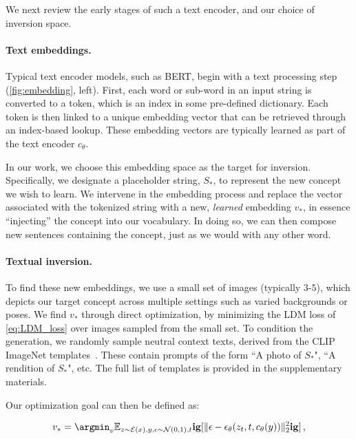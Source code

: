 We next review the early stages of such a text encoder, and our choice of inversion space.

\paragraph{Text embeddings.}

Typical text encoder models, such as BERT, begin with a text processing step (\ref{fig:embedding}, left). First, each word or sub-word in an input string is converted to a token, which is an index in some pre-defined dictionary. Each token is then linked to a unique embedding vector that can be retrieved through an index-based lookup. These embedding vectors are typically learned as part of the text encoder $c_\theta$.

In our work, we choose this embedding space as the target for inversion. Specifically, we designate a placeholder string, $S_*$, to represent the new concept we wish to learn. We intervene in the embedding process and replace the vector associated with the tokenized string with a new,  \textit{learned} embedding $v_*$, in essence ``injecting'' the concept into our vocabulary. In doing so, we can then compose new sentences containing the concept, just as we would with any other word. 

\paragraph{Textual inversion.} To find these new embeddings, we use a small set of images (typically $3$-$5$), which depicts our target concept across multiple settings such as varied backgrounds or poses. We find $v_*$ through direct optimization, by minimizing the LDM loss of \ref{eq:LDM_loss} over images sampled from the small set. To condition the generation, we randomly sample neutral context texts, derived from the CLIP ImageNet templates~\citep{radford2021learning}. These contain prompts of the form ``A photo of $S_*$", ``A rendition of $S_*$", etc. The full list of templates is provided in the supplementary materials.

Our optimization goal can then be defined as:

\begin{equation}
   v_* = \argmin_v \mathbb{E}_{z\sim\mathcal{E}(x), y, \epsilon \sim \mathcal{N}(0, 1), t }\mathbf{ig}[ \Vert \epsilon - \epsilon_\theta(z_{t},t, c_\theta(y)) \Vert_{2}^{2}\mathbf{ig}] \, ,
    \label{eq:v_opt}
\end{equation}

